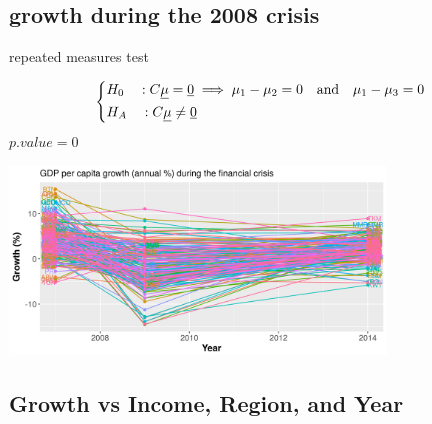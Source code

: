 \documentclass[9pt]{beamer}
\begin{document}
\subsection{growth during the 2008 crisis}

\begin{frame}{repeated measures test}
	\begin{block}{} %
		

		\[
		\begin{dcases}
		H_{0} \quad : C\underline{\mu} = \underline{0} \implies  \mu_{1} - \mu_{2} = 0  \quad\text{and}\quad \mu_1 - \mu_3 = 0 \\
		H_{A} \quad : C\underline{\mu} \ne \underline{0}
		\end{dcases}
		\]
		$ p.value = 0$	
	\end{block}
	\begin{block}{} %
		\includegraphics[height=5cm]{crisis.png}
	\end{block}
\end{frame}

\subsection{Growth vs Income, Region, and Year}
\end{document}
